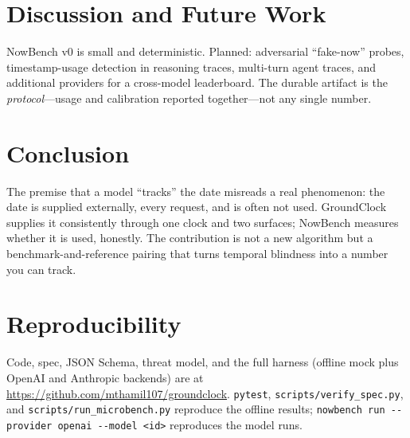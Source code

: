 \documentclass[11pt]{article}
\begin{document}
\section{Discussion and Future Work}
NowBench v0 is small and deterministic. Planned: adversarial ``fake-now'' probes, timestamp-usage
detection in reasoning traces, multi-turn agent traces, and additional providers for a cross-model
leaderboard. The durable artifact is the \emph{protocol}---usage and calibration reported
together---not any single number.

\section{Conclusion}
The premise that a model ``tracks'' the date misreads a real phenomenon: the date is supplied
externally, every request, and is often not used. GroundClock supplies it consistently through one
clock and two surfaces; NowBench measures whether it is used, honestly. The contribution is not a
new algorithm but a benchmark-and-reference pairing that turns temporal blindness into a number you
can track.

\section*{Reproducibility}
Code, spec, JSON Schema, threat model, and the full harness (offline mock plus OpenAI and Anthropic
backends) are at \url{https://github.com/mthamil107/groundclock}. \texttt{pytest},
\texttt{scripts/verify\_spec.py}, and \texttt{scripts/run\_microbench.py} reproduce the offline
results; \texttt{nowbench run -{}-provider openai -{}-model <id>} reproduces the model runs.



\end{document}
